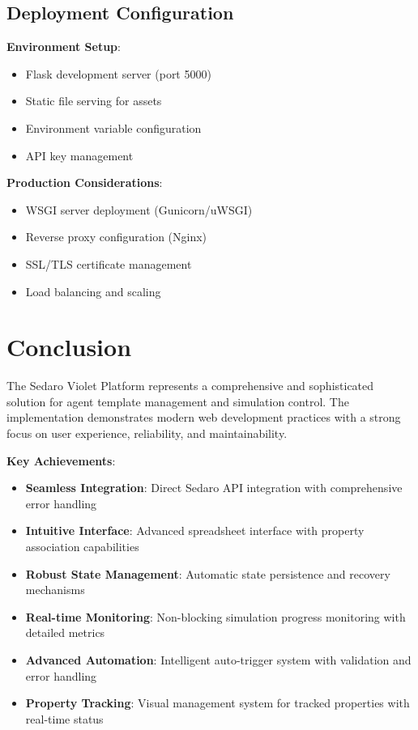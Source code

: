 \documentclass[12pt,a4paper]{article}
\begin{document}
\subsection{Deployment Configuration}

\textbf{Environment Setup}:
\begin{itemize}
    \item Flask development server (port 5000)
    \item Static file serving for assets
    \item Environment variable configuration
    \item API key management
\end{itemize}

\textbf{Production Considerations}:
\begin{itemize}
    \item WSGI server deployment (Gunicorn/uWSGI)
    \item Reverse proxy configuration (Nginx)
    \item SSL/TLS certificate management
    \item Load balancing and scaling
\end{itemize}

\section{Conclusion}

The Sedaro Violet Platform represents a comprehensive and sophisticated solution for agent template management and simulation control. The implementation demonstrates modern web development practices with a strong focus on user experience, reliability, and maintainability.

\textbf{Key Achievements}:
\begin{itemize}
    \item \textbf{Seamless Integration}: Direct Sedaro API integration with comprehensive error handling
    \item \textbf{Intuitive Interface}: Advanced spreadsheet interface with property association capabilities
    \item \textbf{Robust State Management}: Automatic state persistence and recovery mechanisms
    \item \textbf{Real-time Monitoring}: Non-blocking simulation progress monitoring with detailed metrics
    \item \textbf{Advanced Automation}: Intelligent auto-trigger system with validation and error handling
    \item \textbf{Property Tracking}: Visual management system for tracked properties with real-time status
\end{itemize}
\end{document}

